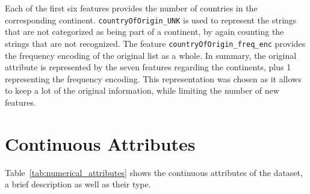 Each of the first six features provides the number of countries in the corresponding continent.
\texttt{countryOfOrigin\_UNK} is used to represent the strings that are not categorized as being part of a
continent, by again counting the strings that are not recognized.
The feature \texttt{countryOfOrigin\_freq\_enc} provides the frequency encoding of the
original list as a whole.
In summary, the original attribute is represented by the seven features regarding
the continents, plus 1 representing the frequency encoding. This representation was chosen as it allows to
keep a lot of the original information, while limiting the number of new features.\\




\section{Continuous Attributes}
Table~\ref{tab:numerical_attributes} shows the continuous attributes of the dataset,
a brief description as well as their type.
